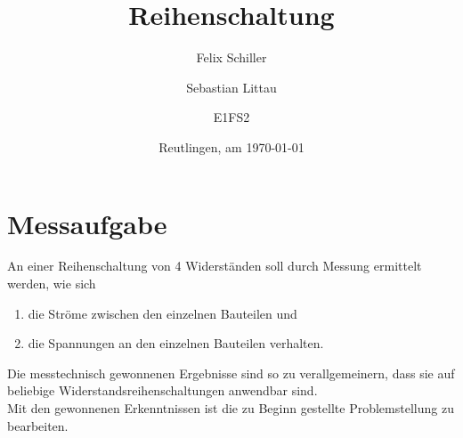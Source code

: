 \documentclass[
a4paper,     %
12pt         %
]{scrartcl}  %
\title{Reihenschaltung}
\author{Felix Schiller \and
Sebastian Littau        \and
E1FS2}
\date{Reutlingen, am \today{}}
\begin{document}

\maketitle

\newpage
\tableofcontents





\section{Messaufgabe}
An einer Reihenschaltung von 4 Widerständen soll durch Messung ermittelt werden, wie sich 
\begin{enumerate}
	\item die Ströme zwischen den einzelnen Bauteilen und 
	\item die Spannungen an den einzelnen Bauteilen verhalten. 
\end{enumerate}
Die messtechnisch gewonnenen Ergebnisse sind so zu verallgemeinern, dass sie auf beliebige Widerstandsreihenschaltungen anwendbar sind. \\
Mit den gewonnenen Erkenntnissen ist die zu Beginn gestellte Problemstellung zu bearbeiten.
\end{document}
